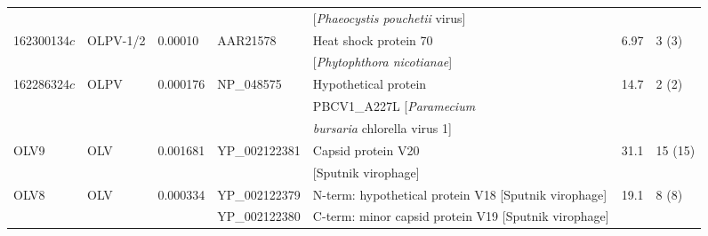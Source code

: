 \begin{table}
\begin{tabularx}{\textwidth}{p{1.3cm}p{1.2cm}p{1cm}p{2cm}p{4.7cm}p{0.6cm}p{1cm}}
 &  &  &  & [\emph{Phaeocystis pouchetii} virus] &  &  \\
162300134$c$ & OLPV-1/2 & 0.00010 & AAR21578 & Heat shock protein 70 & 6.97 & 3 (3) \\
 &  &  &  & [\emph{Phytophthora nicotianae}] &  &  \\
162286324$c$ & OLPV & 0.000176 & NP\_048575 & Hypothetical protein & 14.7 & 2 (2) \\
 &  &  &  & PBCV1\_A227L [\emph{Paramecium} &  &  \\
 &  &  &  & \emph{bursaria} chlorella virus 1] &  &  \\
OLV9 & OLV & 0.001681 & YP\_002122381 & Capsid protein V20 & 31.1 & 15 (15) \\
 &  &  &  & [Sputnik virophage] &  &  \\
OLV8 & OLV & 0.000334 & YP\_002122379 & N-term: hypothetical protein V18 [Sputnik virophage]   & 19.1 & 8 (8) \\
 &  &  & YP\_002122380 &  C-term: minor capsid protein V19 [Sputnik virophage]  &  &  \\
\bottomrule
\end{tabularx}
\end{table}
\endgroup


